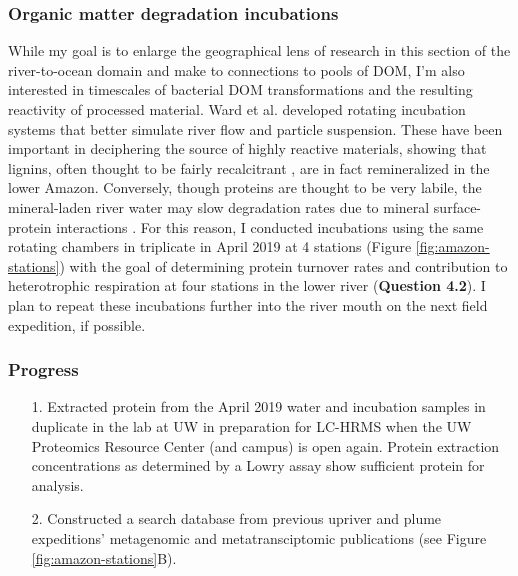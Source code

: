 \documentclass[12pt, letterpaper, twoside]{article}
\begin{document}
\bigskip

\subsubsection{Organic matter degradation incubations}

While my goal is to enlarge the geographical lens of research in this section of the river-to-ocean domain and make to connections to pools of DOM, I'm also interested in timescales of bacterial DOM transformations and the resulting reactivity of processed material. Ward et al. \cite{ward_marine_2018} developed rotating incubation systems that better simulate river flow and particle suspension. These have been important in deciphering the source of highly reactive materials, showing that lignins, often thought to be fairly recalcitrant \cite{hedges_fluxes_1988, gough_terrestrial_1993, opsahl_distribution_1997}, are in fact remineralized in the lower Amazon. Conversely, though proteins are thought to be very labile, the mineral-laden river water may slow degradation rates due to mineral surface-protein interactions \cite{keil_sorptive_1994, mayer_relationships_1994}. For this reason, I conducted incubations using the same rotating chambers in triplicate in April 2019 at 4 stations (Figure \ref{fig:amazon-stations}) with the goal of determining protein turnover rates and contribution to heterotrophic respiration at four stations in the lower river (\textbf{Question 4.2}). I plan to repeat these incubations further into the river mouth on the next field expedition, if possible. 

\subsubsection*{Progress}


\begin{enumerate}
	\item[1.] Extracted protein from the April 2019 water and incubation samples in duplicate in the lab at UW in preparation for LC-HRMS when the UW Proteomics Resource Center (and campus) is open again. Protein extraction concentrations as determined by a Lowry assay show sufficient protein for analysis. 
	\item[2.] Constructed a search database from previous upriver and plume expeditions' metagenomic and metatransciptomic publications \cite{satinsky_amazon_2014, doherty_bacterial_2017, satinsky_metagenomic_2015, ghai_metagenomics_2011}(see Figure \ref{fig:amazon-stations}B).
\end{enumerate}
\end{document}
